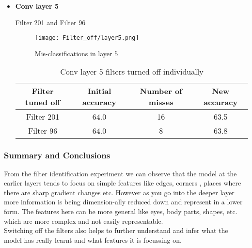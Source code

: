 \documentclass{article}
\begin{document}
\begin{itemize}
    \item \textbf{Conv layer 5}
    
        Filter 201 and Filter 96
    
        \begin{figure}[H]
            \centering
            \texttt{[image: Filter\_off/layer5.png]}
            \vspace{-2.0em}
            \caption{Mis-classifications in layer 5}
            \label{fig:l5_m1}
        \end{figure}
        
        \begin{table}[h!]
        \begin{center}
         \begin{tabular}{||c | c c c||}         
         \hline
        Filter tuned off & Initial accuracy  &  Number of misses &  New accuracy\\ [0.5ex] 
         \hline\hline
             Filter 201 & 64.0 & 16 & 63.5\\
             \hline
             Filter 96 & 64.0 & 8 & 63.8\\
         \hline
         \end{tabular}
        \end{center}
        \label{table:conv5_off}
        \vspace{-1.0em}
        \caption{Conv layer 5 filters turned off individually} 
        \end{table}


\end{itemize}


\subsubsection{Summary and Conclusions}
From the filter identification experiment we can observe that the model at the earlier layers tends to focus on simple features like edges, corners , places where there are sharp gradient changes etc. However as you go into the deeper layer more information is being dimension-ally reduced down and represent in a lower form. The features here can be more general like eyes, body parts, shapes, etc. which are more complex and not easily representable. 
\\

\noindent
Switching off the filters also helps to further understand and infer what the model has really learnt and what features it is focussing on.
\end{document}
